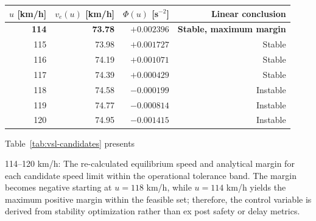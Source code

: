 \documentclass[11pt,a4paper,openany]{book}
\numberwithin{equation}{chapter}
\numberwithin{figure}{chapter}
\numberwithin{table}{chapter}
\newcommand{\tabletext}[2]{%
  \par\smallskip\noindent
  Table~\ref{#1} presents #2
\par\smallskip
}
\begin{document}
\begin{center}
\small
{}
\label{tab:vsl-candidates}
\begin{tabular}{rrrr}
\toprule
$u$ [km/h] & $v_e(u)$ [km/h] & $\Phi(u)$ [s$^{-2}$] &




 Linear conclusion



\\
\midrule
\textbf{114} & \textbf{73.78} & \textbf{$+0.002396$} & \textbf{Stable, maximum margin} \\
115 & 73.98 & $+0.001727$ &




 Stable



\\
116 & 74.19 & $+0.001071$ &




 Stable



\\
117 & 74.39 & $+0.000429$ &




 Stable



\\
118 & 74.58 & $-0.000199$ &




 Instable



\\
119 & 74.77 & $-0.000814$ &




 Instable



\\
120 & 74.95 & $-0.001415$ &




 Instable



\\
\bottomrule
\end{tabular}
\end{center}
\tabletext{tab:vsl-candidates}{




114–120 km/h: The re-calculated equilibrium speed and analytical margin for each candidate speed limit within the operational tolerance band. The margin becomes negative starting at $u=118$ km/h, while $u=114$ km/h yields the maximum positive margin within the feasible set; therefore, the control variable is derived from stability optimization rather than ex post safety or delay metrics.}
\end{document}

